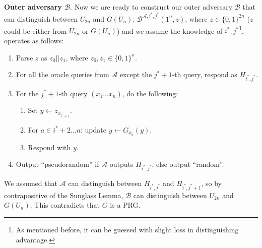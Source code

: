 \noindent \textbf{Outer adversary $\mathcal{B}$}. Now we are ready to construct our outer adversary $\mathcal{B}$ that can distinguish between $U_{2n}$ and $G(U_n)$. $\mathcal{B}^{\mathcal{A}, i^*, j^*}(1^n, z)$, where $z \in \{0, 1\}^{2n}$ ($z$ could be either from $U_{2n}$ or $G(U_n)$) and we assume the knowledge of $i^*, j^*$\footnote{As mentioned before, it can be guessed with slight loss in distinguishing advantage.}, operates as follows:
\begin{enumerate}
    \item Parse $z$ as $z_0||z_1$, where $z_0, z_1 \in \{0, 1\}^n$.
    \item For all the oracle queries from $\mathcal{A}$ except the $j^*+1$-th query, respond as $H_{i^*,j^*}$.
    \item For the $j^*+1$-th query $(x_1\dots x_n)$, do the following:
          \begin{enumerate}
              \item Set $y \gets z_{x_{i^*+1}}$.
              \item For $a \in i^*+2 \dots n$: update $y \gets G_{x_a}(y)$.
              \item Respond with $y$.
          \end{enumerate}
    \item Output ``pseudorandom'' if $\mathcal{A}$ outputs $H_{i^*,j^*}$, else output ``random''.
\end{enumerate}

We assumed that $\mathcal{A}$ can distinguish between $H_{i^*, j^*}$ and $H_{i^*, j^*+1}$, so by contrapositive of the Sunglass Lemma, $\mathcal{B}$ can distinguish between $U_{2n}$ and $G(U_n)$. This contradicts that $G$ is a PRG.

